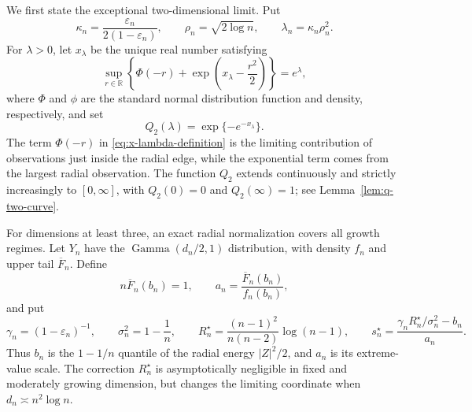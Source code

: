 \documentclass[11pt]{article}
\theoremstyle{remark}
\numberwithin{equation}{section}
\newcommand{\R}{\mathbb R}
\newcommand{\eps}{\varepsilon}
\begin{document}
We first state the exceptional two-dimensional limit. Put
\begin{equation}
\label{eq:d2-intro-parameters}
    \kappa_n=\frac{\eps_n}{2(1-\eps_n)},
    \qquad
    \rho_n=\sqrt{2\log n},
    \qquad
    \lambda_n=\kappa_n\rho_n^2.
\end{equation}
For $\lambda>0$, let $x_\lambda$ be the unique real number satisfying
\begin{equation}
\label{eq:x-lambda-definition}
    \sup_{r\in\R}
       \left\{\Phi(-r)+\exp\left(x_\lambda-\frac{r^2}{2}\right)\right\}
    =e^\lambda,
\end{equation}
where $\Phi$ and $\phi$ are the standard normal distribution function and
density, respectively, and set
\begin{equation}
\label{eq:Q2-definition}
    Q_2(\lambda)=\exp\{-e^{-x_\lambda}\}.
\end{equation}
The term $\Phi(-r)$ in \eqref{eq:x-lambda-definition} is the limiting
contribution of observations just inside the radial edge, while the
exponential term comes from the largest radial observation. The function
\(Q_2\) extends continuously and strictly increasingly to \([0,\infty]\), with
\(Q_2(0)=0\) and \(Q_2(\infty)=1\); see Lemma~\ref{lem:q-two-curve}.

For dimensions at least three, an exact radial normalization covers all
growth regimes. Let $Y_n$ have the $\operatorname{Gamma}(d_n/2,1)$
distribution, with density $f_n$ and upper tail $\overline F_n$. Define
\begin{equation}
\label{eq:ba-intro}
    n\overline F_n(b_n)=1,
    \qquad
    a_n=\frac{\overline F_n(b_n)}{f_n(b_n)},
\end{equation}
and put
\begin{equation}
\label{eq:exact-intro-coordinate}
    \gamma_n=(1-\eps_n)^{-1},
    \qquad
    \sigma_n^2=1-\frac1n,
    \qquad
    R_n^\star=\frac{(n-1)^2}{n(n-2)}\log(n-1),
    \qquad
    s_n^\star
    =\frac{\gamma_nR_n^\star/\sigma_n^2-b_n}{a_n}.
\end{equation}
Thus $b_n$ is the \(1-1/n\) quantile of the radial energy \(|Z|^2/2\), and
$a_n$ is its extreme-value scale. The correction $R_n^\star$ is asymptotically
negligible in fixed and moderately growing dimension, but changes the limiting
coordinate when $d_n\asymp n^2\log n$.
\end{document}
